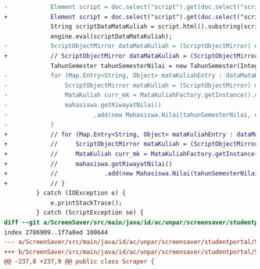 \begin{lstlisting}[language=diff, caption=Perbedaan kode dosen dengan mahasiswa, label=diff_dosen_mahasiswa]
-            Element script = doc.select("script").get(doc.select("script").size() - 1);
+            Element script = doc.select("script").get(doc.select("script").size()-1);
             String scriptDataMataKuliah = script.html().substring(script.html().indexOf("var data_mata_kuliah = [];"), script.html().indexOf("var data_angket = [];"));
             engine.eval(scriptDataMataKuliah);
-            ScriptObjectMirror dataMataKuliah = (ScriptObjectMirror) engine.get("data_mata_kuliah");
+            // ScriptObjectMirror dataMataKuliah = (ScriptObjectMirror) engine.get("data_mata_kuliah");
             TahunSemester tahunSemesterNilai = new TahunSemester(Integer.parseInt(thn), sem.charAt(0));
-            for (Map.Entry<String, Object> mataKuliahEntry : dataMataKuliah.entrySet()) {
-                ScriptObjectMirror mataKuliah = (ScriptObjectMirror) mataKuliahEntry.getValue();
-                MataKuliah curr_mk = MataKuliahFactory.getInstance().createMataKuliah((String) mataKuliah.get("kode_mata_kuliah"), Integer.parseInt((String) mataKuliah.get("jumlah_sks")), (String) mataKuliah.get("nama_mata_kuliah"));
-                mahasiswa.getRiwayatNilai()
-                        .add(new Mahasiswa.Nilai(tahunSemesterNilai, curr_mk, (String) mataKuliah.get("na")));
-            }
+            // for (Map.Entry<String, Object> mataKuliahEntry : dataMataKuliah.entrySet()) {
+            //     ScriptObjectMirror mataKuliah = (ScriptObjectMirror) mataKuliahEntry.getValue();
+            //     MataKuliah curr_mk = MataKuliahFactory.getInstance().createMataKuliah((String) mataKuliah.get("kode_mata_kuliah"), Integer.parseInt((String) mataKuliah.get("jumlah_sks")), (String) mataKuliah.get("nama_mata_kuliah"));
+            //     mahasiswa.getRiwayatNilai()
+            //             .add(new Mahasiswa.Nilai(tahunSemesterNilai, curr_mk, (String) mataKuliah.get("na")));
+            // }
         } catch (IOException e) {
             e.printStackTrace();
         } catch (ScriptException se) {
diff --git a/ScreenSaver/src/main/java/id/ac/unpar/screensaver/studentportal/Scraper.java b/ScreenSaver/src/main/java/id/ac/unpar/screensaver/studentportal/Scraper.java
index 2786909..1f7a8ed 100644
--- a/ScreenSaver/src/main/java/id/ac/unpar/screensaver/studentportal/Scraper.java
+++ b/ScreenSaver/src/main/java/id/ac/unpar/screensaver/studentportal/Scraper.java
@@ -237,8 +237,9 @@ public class Scraper {
 

\end{lstlisting}
